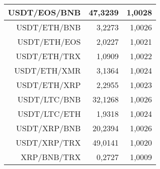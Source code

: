 \begin{table}
\begin{tabular}{|| r | r | r ||}
 \hline USDT/EOS/BNB & 47,3239 & 1,0028\\ 
 \hline USDT/ETH/BNB & 3,2273 & 1,0026\\ 
 \hline USDT/ETH/EOS & 2,0227 & 1,0021\\ 
 \hline USDT/ETH/TRX & 1,0909 & 1,0022\\ 
 \hline USDT/ETH/XMR & 3,1364 & 1,0024\\ 
 \hline USDT/ETH/XRP & 2,2955 & 1,0023\\ 
 \hline USDT/LTC/BNB & 32,1268 & 1,0026\\ 
 \hline USDT/LTC/ETH & 1,9318 & 1,0024\\ 
 \hline USDT/XRP/BNB & 20,2394 & 1,0026\\ 
 \hline USDT/XRP/TRX & 49,0141 & 1,0020\\ 
 \hline XRP/BNB/TRX & 0,2727 & 1,0009\\ 
 \hline
\end{tabular}
\end{table}